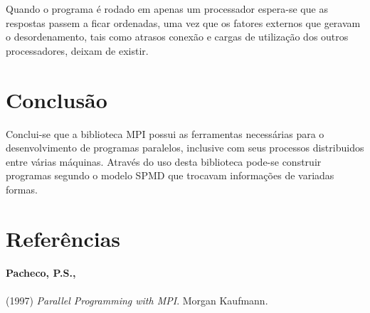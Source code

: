 \documentclass[11pt,a4paper,onecolumn]{article}
\begin{document}
Quando o programa é rodado em apenas um processador espera-se que as respostas passem a ficar ordenadas, uma vez que os fatores externos que geravam o desordenamento, tais como atrasos conexão e cargas de utilização dos outros processadores, deixam de existir.

\section{Conclusão}
Conclui-se que a biblioteca MPI possui as ferramentas necessárias para o desenvolvimento de programas paralelos, inclusive com seus processos distribuidos entre várias máquinas.
Através do uso desta biblioteca pode-se construir programas segundo o modelo SPMD que trocavam informações de variadas formas.

\section{Referências}
\paragraph{Pacheco, P.S.,} (1997) \textit{Parallel Programming with MPI}. Morgan Kaufmann.
\end{document}

